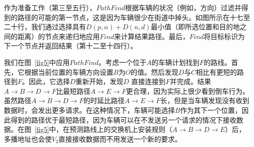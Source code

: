 作为准备工作（第三至五行），$PathFind$根据车辆的状况（例如，方向）过滤并得到的路径的可能的第一节点，这是因为车辆很少在街道中掉头。如图所示在十七至二十行，我们通过选择具有$D(p,n)+D(n,d)$最小值（即所选位置和目的地之间的距离）的节点来递归地应用$Find$来计算结果路径。最后，$Find$将目标标识为下一个节点并返回结果（第十二至十四行）。


我们在图~\ref{fig5}中应用$PathFind$。考虑一个位于$A$的车辆计划找到$F$的路线。首先，它根据当前位置的车辆方向设置$B$为$O$的值。然后发现$D$与$C$相比有更短的路径到$F$。因此，它选择$D$重新开始，发现$D$
直接连接到$F$并完成。结果$ A \to B \to D \to F $比最短路径$ A \to E \to F $更合理，因为实际上很少看到倒车行为。虽然路径$ A \to B \to D \to F $的时延比路径$ A \to E \to F $长，但是当车辆发现没有收到数据时，会发出更多请求。在这种情况下，车辆可能选择$B$作为其下一个位置，因此得到的路径优于最短路径，因为车辆可以在不发送另一个请求的情况下接收数据。在图~\ref{fig5}中，在预测路线上的交换机上安装规则（$ A \to B \to D \to E $）后，多播地址也会使$V_{2}$直接接收数据而不用发送一个新的要求。
%
%



